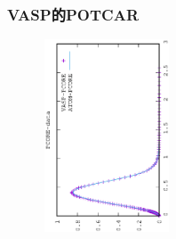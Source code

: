 \frame
{
	\frametitle{\rm{VASP}的\rm{POTCAR}}
\begin{minipage}{0.58\textwidth}
\centering
\vspace{-0.10in}
\fontsize{3.3pt}{1.9pt}\selectfont{
}
\end{minipage}
\hfill
\begin{minipage}{0.40\textwidth}
\begin{figure}[t!]
\centering
\vspace{-0.05in}
\includegraphics[height=2.25in,width=1.5in,viewport=0 0 350 550, angle=-90, clip]{Figures/PCORE-data.eps}
\label{psedudocore_density_Function}
\end{figure}
\end{minipage}
}


